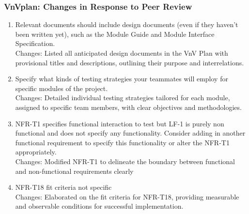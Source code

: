 \documentclass{article}
\begin{document}
\subsubsection{VnVplan: Changes in Response to Peer Review}
\begin{enumerate}
        \item Relevant documents should include design documents (even if they 
        haven't been written yet), such as the Module Guide and Module Interface 
        Specification.\\
        Changes: Listed all anticipated design documents in the VnV Plan with provisional titles and descriptions, outlining their purpose and interrelations.
        \item Specify what kinds of testing strategies your teammates will employ 
        for specific modules of the project.\\
        Changes: Detailed individual testing strategies tailored for each module, assigned to specific team members, with clear objectives and methodologies.
        \item NFR-T1 specifies functional interaction to test but LF-1 is purely 
        non functional and does not specify any functionality. Consider adding 
        in another functional requirement to specify this functionality or alter 
        the NFR-T1 appropriately.\\
        Changes: Modified NFR-T1 to delineate the boundary between functional and non-functional requirements clearly
        \item NFR-T18 fit criteria not specific\\
        Changes: Elaborated on the fit criteria for NFR-T18, providing measurable and observable conditions for successful implementation.
\end{enumerate} 
\end{document}
